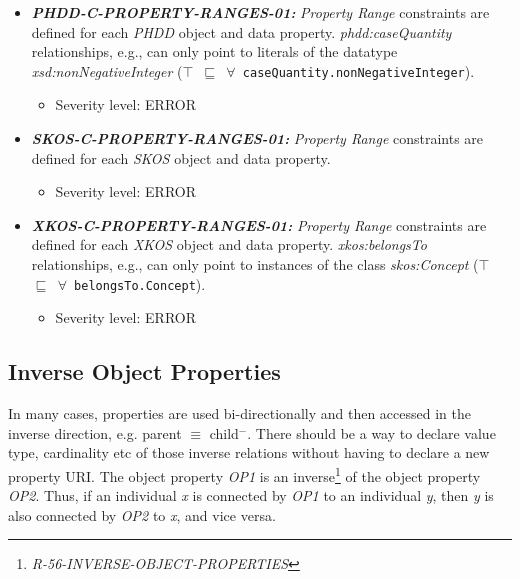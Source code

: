 \documentclass{llncs}
\newcommand{\ms}[1]{\texttt{#1}}
\begin{document}
\begin{itemize}
	\item \textbf{{\em PHDD-C-PROPERTY-RANGES-01:}} 
	{\em Property Range} constraints are defined for each \emph{PHDD} object and data property.
  {\em phdd:caseQuantity} relationships, e.g., can only point to literals of the datatype {\em xsd:nonNegativeInteger} (\ms{$\top$ $\sqsubseteq$ $\forall$ caseQuantity.nonNegativeInteger}).
	\begin{itemize}
		\item Severity level: ERROR
	\end{itemize}
\end{itemize}

\begin{itemize}
	\item \textbf{{\em SKOS-C-PROPERTY-RANGES-01:}} 
	{\em Property Range} constraints are defined for each \emph{SKOS} object and data property.
	\begin{itemize}
		\item Severity level: ERROR
	\end{itemize}
\end{itemize}

\begin{itemize}
	\item \textbf{{\em XKOS-C-PROPERTY-RANGES-01:}} 
	{\em Property Range} constraints are defined for each \emph{XKOS} object and data property.
  {\em xkos:belongsTo} relationships, e.g., can only point to instances of the class {\em skos:Concept} (\ms{$\top$ $\sqsubseteq$ $\forall$ belongsTo.Concept}).
	\begin{itemize}
		\item Severity level: ERROR
	\end{itemize}
\end{itemize}

\subsection{Inverse Object Properties}

In many cases, properties are used bi-directionally and then accessed in the inverse direction, e.g. parent $\equiv$ child$^{-}$. There should be a way to declare value type, cardinality etc of those inverse relations without having to declare a new property URI. 
The object property \emph{OP1} is an inverse\footnote{\emph{R-56-INVERSE-OBJECT-PROPERTIES}} of the object property \emph{OP2}. 
Thus, if an individual \emph{x} is connected by \emph{OP1} to an individual \emph{y}, then \emph{y} is also connected by \emph{OP2} to \emph{x}, and vice versa.
\end{document}
